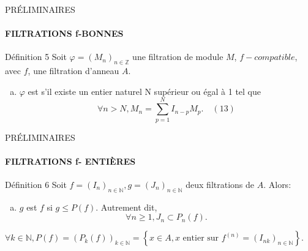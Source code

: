 \documentclass[11pt,a4paper]{beamer}
\begin{document}
	\begin{frame}{PRÉLIMINAIRES}
		\framesubtitle{FILTRATIONS f-BONNES}
		\begin{block}{Définition 5}
			Soit $\varphi=(M_n)_{n \in \mathbb{Z}}$ une filtration de module $M$, $f-compatible$, avec $f$, une filtration d'anneau $A$.
			\begin{enumerate}[(a)]
				\item $\varphi$ est  s'il existe un entier naturel N supérieur ou égal à 1 tel que
				\[\forall n > N, M_{n}=\sum_{p=1}^{N}I_{n-p}M_{p}. \quad (13)\]
			\end{enumerate}
		\end{block}
	\end{frame}
	
		\begin{frame}{PRÉLIMINAIRES}
		\framesubtitle{FILTRATIONS f- ENTIÈRES}
		\begin{block}{Définition 6}
			Soit $f=(I_n)_{n \in \mathbb{N}} , g = (J_n)_{n \in \mathbb{N}}$ deux filtrations de $A$.  Alors:\\
			\begin{enumerate}[(b)]
					\item $g$ est  $f$ si $g \leqslant P(f)$. Autrement dit,
				\[\forall n \geqslant 1, J_n \subset P_{n}(f). \]
			\end{enumerate}
			$\forall k \in \mathbb{N}, P(f)=(P_k(f))_{k \in \mathbb{N}} =\left\{x \in A, x \text{ entier sur } f^{(n)} = (I_{nk})_{n \in \mathbb{N}}\right\}.$
		\end{block}
	\end{frame}
	
\end{document}
